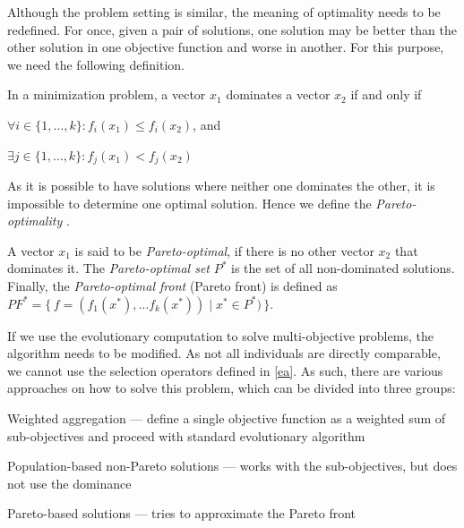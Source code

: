 Although the problem setting is similar, the meaning of optimality needs to 
be redefined. For once, given a pair of solutions, one solution may be better 
than the other solution in one objective function and worse in another. For 
this purpose, we need the following definition.

\begin{definition}[Domination]
In a minimization problem, a vector $x_1$ dominates a vector $x_2$ if and 
only if 
\begin{compactitem}
\item $\forall i\in\{1,\ldots,k\}: f_i(x_1) \leq f_i(x_2)$, and
\item $\exists j\in\{1,\ldots,k\}: f_j(x_1) < f_j(x_2)$
\end{compactitem}
\end{definition}

As it is possible to have solutions where neither one dominates the other,
it is impossible to determine one optimal solution. Hence we define the 
\emph{Pareto-optimality}
\citep[p.~551-561,~569--573]{Engelbrecht:2007:CII:1557464}.

\begin{definition}
A vector $x_1$ is said to be \emph{Pareto-optimal}, if there is no other vector
$x_2$ that dominates it. The \emph{Pareto-optimal set} $P^*$ is the set of all
non-dominated solutions. Finally, the \emph{Pareto-optimal front} (Pareto front)
is defined as
$PF^* =\{\, f=(f_1(x^*),\ldots f_k(x^*)) \mid x^* \in P^* ) \,\}$. 
\end{definition}

If we use the evolutionary computation to solve multi-objective problems, the
algorithm needs to be modified. As not all individuals are directly
comparable, we cannot use the selection operators defined in
\ref{ea}. As such, there are various approaches on how to solve this problem,
which can be divided into three groups:

\begin{compactitem}
\item Weighted aggregation --- define a single objective function as a weighted
sum of sub-objectives and proceed with standard evolutionary algorithm
\item Population-based non-Pareto solutions --- works with the sub-objectives,
but does not use the dominance
\item Pareto-based solutions --- tries to approximate the Pareto front
\end{compactitem}


